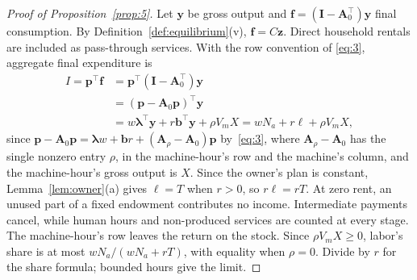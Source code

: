 \documentclass[12pt]{article}
\theoremstyle{plain}
\theoremstyle{definition}
\theoremstyle{remark}
\begin{document}
\begin{proof}[Proof of Proposition~\ref{prop:5}]
Let $\mathbf{y}$ be gross output and $\mathbf{f}=(\mathbf{I}-\mathbf{A}_0^{\top})\mathbf{y}$ final consumption.
By Definition~\ref{def:equilibrium}(v), $\mathbf f=C\mathbf z$.
Direct household rentals are included as pass-through services. With the row convention of \eqref{eq:3}, aggregate final expenditure is
\begin{align*}
I=\mathbf{p}^{\top}\mathbf{f}&=\mathbf{p}^{\top}(\mathbf{I}-\mathbf{A}_0^{\top})\mathbf{y}\\
&=(\mathbf{p}-\mathbf{A}_0\mathbf{p})^{\top}\mathbf{y}\\
&=w\boldsymbol{\lambda}^{\top}\mathbf{y}+r\mathbf{b}^{\top}\mathbf{y}+\rho V_mX=wN_a+r\ell+\rho V_mX,
\end{align*}
since $\mathbf p-\mathbf A_0\mathbf p=\bm\lambda w+\mathbf br+(\mathbf A_\rho-\mathbf A_0)\mathbf p$ by~\eqref{eq:3}, where $\mathbf A_\rho-\mathbf A_0$ has the single nonzero entry $\rho$, in the machine-hour's row and the machine's column, and the machine-hour's gross output is $X$. Since the owner's plan is constant, Lemma~\ref{lem:owner}(a) gives $\ell=T$ when $r>0$, so $r\ell=rT$.
At zero rent, an unused part of a fixed endowment contributes no income.
Intermediate payments cancel, while human hours and non-produced services are counted at every stage.
The machine-hour's row leaves the return on the stock.
Since $\rho V_mX\ge0$, labor's share is at most $wN_a/(wN_a+rT)$, with equality when $\rho=0$.
Divide by $r$ for the share formula; bounded hours give the limit.

\end{proof}
\end{document}
